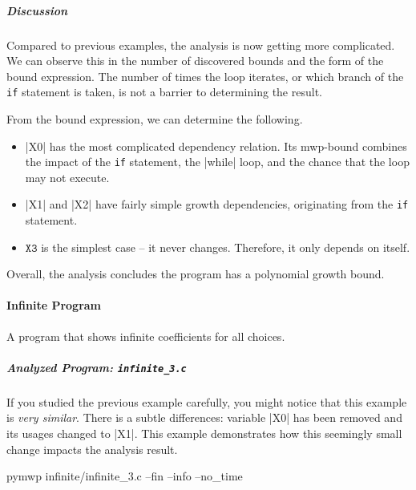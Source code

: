 \subparagraph*{Discussion}\label{discussion}

Compared to previous examples, the analysis is now getting more complicated.
We can observe this in the number of discovered bounds and the form of the bound expression.
The number of times the loop iterates, or which branch of the \texttt{if} statement is taken, is not a barrier to determining the result.

From the bound expression, we can determine the following.

\begin{itemize}
\item \pr|X0| has the most complicated dependency relation.
Its mwp-bound combines the impact of the \texttt{if} statement, the \pr|while| loop, and the chance that the loop may not execute.

\item \pr|X1| and \pr|X2| have fairly simple growth dependencies, originating from the \texttt{if} statement.

\item \(\texttt{X3}\) is the simplest case -- it never changes.
Therefore, it only depends on itself.
\end{itemize}

Overall, the analysis concludes the program has a polynomial growth bound.

\paragraph{Infinite Program}\label{inf-prog}
A program that shows infinite coefficients for all choices.

\subparagraph*{Analyzed Program: \texttt{infinite\_3.c}}\mbox{}

\begin{minipage}{\textwidth}

\end{minipage}

If you studied the previous example carefully, you might notice that this example is \emph{very similar}.
There is a subtle differences: variable \pr|X0| has been removed and its usages changed to \pr|X1|.
This example demonstrates how this seemingly small change impacts the analysis result.

\begin{cmdlisting}[label={lst:ex4-run-cmd}]
pymwp infinite/infinite_3.c --fin --info --no_time
\end{cmdlisting}


